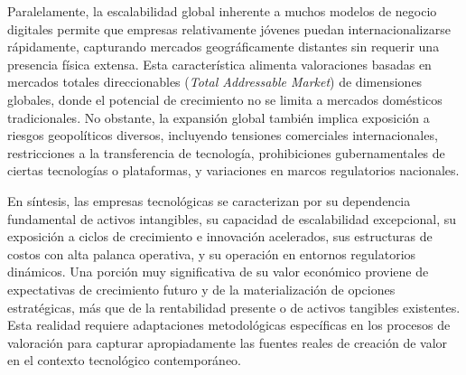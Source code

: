 Paralelamente, la escalabilidad global inherente a muchos modelos de negocio digitales permite que empresas relativamente jóvenes puedan internacionalizarse rápidamente, capturando mercados geográficamente distantes sin requerir una presencia física extensa. Esta característica alimenta valoraciones basadas en mercados totales direccionables (\emph{Total Addressable Market}) de dimensiones globales, donde el potencial de crecimiento no se limita a mercados domésticos tradicionales. No obstante, la expansión global también implica exposición a riesgos geopolíticos diversos, incluyendo tensiones comerciales internacionales, restricciones a la transferencia de tecnología, prohibiciones gubernamentales de ciertas tecnologías o plataformas, y variaciones en marcos regulatorios nacionales.

En síntesis, las empresas tecnológicas se caracterizan por su dependencia fundamental de activos intangibles, su capacidad de escalabilidad excepcional, su exposición a ciclos de crecimiento e innovación acelerados, sus estructuras de costos con alta palanca operativa, y su operación en entornos regulatorios dinámicos. Una porción muy significativa de su valor económico proviene de expectativas de crecimiento futuro y de la materialización de opciones estratégicas, más que de la rentabilidad presente o de activos tangibles existentes. Esta realidad requiere adaptaciones metodológicas específicas en los procesos de valoración para capturar apropiadamente las fuentes reales de creación de valor en el contexto tecnológico contemporáneo.
